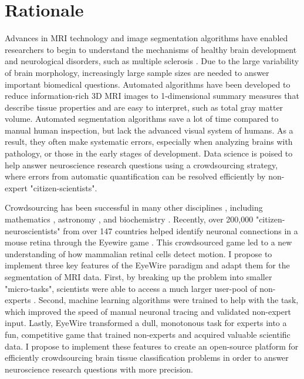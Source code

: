 \section*{Rationale}

Advances in MRI technology and image segmentation algorithms have enabled researchers to begin to understand the mechanisms of healthy brain development \cite{giedd1999brain} and neurological disorders, such as multiple sclerosis \cite{bakshi2008mri}. Due to the large variability of brain morphology, increasingly large sample sizes are needed to answer important biomedical questions. Automated algorithms have been developed to reduce information-rich 3D MRI images to 1-dimensional summary measures that describe tissue properties and are easy to interpret, such as total gray matter volume. Automated  segmentation algorithms save a lot of time compared to manual human inspection, but lack the advanced visual system of humans. As a result, they often make systematic errors, especially when analyzing brains with pathology, or those in the early stages of development. Data science is poised to help answer neuroscience research questions using a crowdsourcing strategy, where errors from automatic quantification can be resolved efficiently by non-expert "citizen-scientists".

Crowdsourcing has been successful in many other disciplines \cite{wiggins2011conservation}, including mathematics \cite{cranshaw2011polymath}, astronomy \cite{lintott2008galaxy}, and biochemistry \cite{eiben2012increased} . Recently, over 200,000 "citizen-neuroscientists"  from over 147 countries helped identify neuronal connections in a mouse retina through the Eyewire game \cite{kim2014space}. This crowdsourced game led to a new understanding of how mammalian retinal cells detect motion. I propose to implement three key features of the EyeWire paradigm and adapt them for the segmentation of MRI data. First, by breaking up the problem into smaller "micro-tasks", scientists were able to access a much larger user-pool of non-experts \cite{kittur2008crowdsourcing}. Second, machine learning algorithms were trained to help with the task, which improved the speed of manual neuronal tracing and validated non-expert input. Lastly, EyeWire transformed a dull, monotonous task for experts into a fun, competitive game that trained non-experts and acquired valuable scientific data. I propose to implement these features to create an open-source platform for efficiently crowdsourcing brain tissue classification problems in order to answer neuroscience research questions with more precision.

